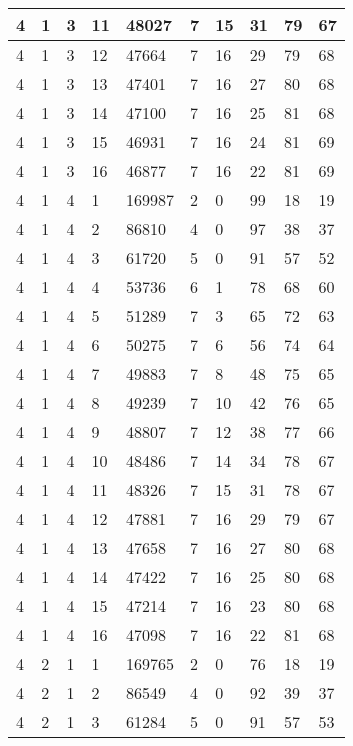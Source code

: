 \begin{table}[!ht]
\begin{tabular}{|l|l|l|l|l|l|l|l|l|l|}
        4 & 1 & 3 & 11 & 48027 & 7 & 15 & 31 & 79 & 67 \\ \hline
        4 & 1 & 3 & 12 & 47664 & 7 & 16 & 29 & 79 & 68 \\ \hline
        4 & 1 & 3 & 13 & 47401 & 7 & 16 & 27 & 80 & 68 \\ \hline
        4 & 1 & 3 & 14 & 47100 & 7 & 16 & 25 & 81 & 68 \\ \hline
        4 & 1 & 3 & 15 & 46931 & 7 & 16 & 24 & 81 & 69 \\ \hline
        4 & 1 & 3 & 16 & 46877 & 7 & 16 & 22 & 81 & 69 \\ \hline
        4 & 1 & 4 & 1 & 169987 & 2 & 0 & 99 & 18 & 19 \\ \hline
        4 & 1 & 4 & 2 & 86810 & 4 & 0 & 97 & 38 & 37 \\ \hline
        4 & 1 & 4 & 3 & 61720 & 5 & 0 & 91 & 57 & 52 \\ \hline
        4 & 1 & 4 & 4 & 53736 & 6 & 1 & 78 & 68 & 60 \\ \hline
        4 & 1 & 4 & 5 & 51289 & 7 & 3 & 65 & 72 & 63 \\ \hline
        4 & 1 & 4 & 6 & 50275 & 7 & 6 & 56 & 74 & 64 \\ \hline
        4 & 1 & 4 & 7 & 49883 & 7 & 8 & 48 & 75 & 65 \\ \hline
        4 & 1 & 4 & 8 & 49239 & 7 & 10 & 42 & 76 & 65 \\ \hline
        4 & 1 & 4 & 9 & 48807 & 7 & 12 & 38 & 77 & 66 \\ \hline
        4 & 1 & 4 & 10 & 48486 & 7 & 14 & 34 & 78 & 67 \\ \hline
        4 & 1 & 4 & 11 & 48326 & 7 & 15 & 31 & 78 & 67 \\ \hline
        4 & 1 & 4 & 12 & 47881 & 7 & 16 & 29 & 79 & 67 \\ \hline
        4 & 1 & 4 & 13 & 47658 & 7 & 16 & 27 & 80 & 68 \\ \hline
        4 & 1 & 4 & 14 & 47422 & 7 & 16 & 25 & 80 & 68 \\ \hline
        4 & 1 & 4 & 15 & 47214 & 7 & 16 & 23 & 80 & 68 \\ \hline
        4 & 1 & 4 & 16 & 47098 & 7 & 16 & 22 & 81 & 68 \\ \hline
        4 & 2 & 1 & 1 & 169765 & 2 & 0 & 76 & 18 & 19 \\ \hline
        4 & 2 & 1 & 2 & 86549 & 4 & 0 & 92 & 39 & 37 \\ \hline
        4 & 2 & 1 & 3 & 61284 & 5 & 0 & 91 & 57 & 53 \\ \hline

\end{tabular}
\end{table}
